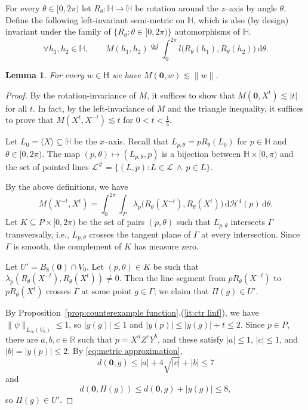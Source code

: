 \documentclass[11pt,reqno]{amsart}
\renewcommand{\H}{\mathbb{H}}
\newcommand{\R}{\mathbb{R}}
\newcommand{\cH}{\mathcal{H}}
\newcommand{\cL}{\mathcal{L}}
\newcommand{\ud}[0]{\,\mathrm{d}}
\newcommand{\0}{\mathbf{0}}
\renewcommand{\1}{\mathbf 1}
\newcommand{\from}{\colon}
\renewcommand{\mid}{:}
\renewcommand{\subset}{\subseteq}
\newcommand{\eqdef}{\stackrel{\mathrm{def}}{=}}
\renewcommand{\le}{\leqslant}
\newtheorem{lemma}[thm]{Lemma}
\theoremstyle{remark}
\begin{document}
For every $\theta\in [0,2\pi)$ let $R_\theta\from \H\to \H$ be  rotation around the $z$--axis by angle $\theta$.  Define the following left-invariant semi-metric on $\H$, which is also (by design) invariant under the family of $\{R_\theta: \theta\in [0,2\pi)\}$ automorphisms of $\H$.
$$
\forall  h_1,h_2\in \H,\qquad M(h_1,h_2)\eqdef \int_0^{2\pi} l\big(R_\theta(h_1),R_\theta(h_2)\big)\ud \theta.
$$

\begin{lemma}\label{lem:ctr M lipschitz}
  For every $w\in \mathsf{H}$ we have $M(\0,w)\lesssim \|w\|$.
\end{lemma}

\begin{proof}
  By the rotation-invariance of $M$, it suffices to show that $M(\0,X^t)\lesssim |t|$ for all $t$.  In fact, by the left-invariance of $M$ and the triangle inequality, it suffices to prove that $M(X^t,X^{-t})\lesssim t$ for $0<t<\frac14$.

  Let $L_0=\langle X\rangle\subset \H$ be the $x$--axis.  Recall that $L_{p,\theta}=pR_\theta(L_0)$ for  $p\in \H$ and $\theta\in [0,2\pi)$.  The map $(p,\theta)\mapsto (L_{p, \theta},p)$ is a bijection between $\H\times [0,\pi)$ and the set of pointed lines $\cL^\#=\{(L,p)\mid L\in \cL\ \wedge\  p\in L\}$.

  By the above definitions, we have
  $$M(X^{-t},X^t) = \int_{0}^{2\pi} \int_{P} \lambda_{p}\big(R_\theta(X^{-t}),R_\theta(X^t)\big) \ud\cH^4(p) \ud\theta.$$
  Let $K\subset P \times [0,2\pi)$ be the set of pairs $(p,\theta)$ such that $L_{p,\theta}$ intersects $\Gamma$ transversally, i.e., $L_{p,\theta}$ crosses the tangent plane of $\Gamma$ at every intersection. Since $\Gamma$ is smooth, the complement of $K$ has measure zero.

  Let $U'=B_{8}(\0)\cap V_0$.
  Let $(p,\theta)\in K$ be such that $\lambda_{p}(R_\theta(X^{-t}),R_\theta(X^t))\ne 0$. Then the line segment from $pR_\theta(X^{-t})$ to $pR_\theta(X^t)$ crosses $\Gamma$ at some point $g\in \Gamma$; we claim that $\Pi(g)\in U'$.

  By Proposition~\ref{prop:counterexample function}.(\ref{it:ctr linf}), we have $\|\psi\|_{L_\infty(V_0)}\le 1$, so $|y(g)|\le 1$ and $|y(p)|\le |y(g)|+t\le 2$. Since $p\in P$, there are $a, b,c\in \R$ such that $p=X^aZ^cY^b$, and these satisfy $|a|\le 1$, $|c|\le 1$, and $|b|=|y(p)|\le 2$. By \eqref{eq:metric approximation},
  $$d(\0, g)\le |a| + 4\sqrt{|c|} + |b| \le 7$$
  and
  $$d(\0, \Pi(g))\le d(\0, g) + |y(g)|\le 8,$$
  so $\Pi(g)\in U'$.


\end{proof}
\end{document}

